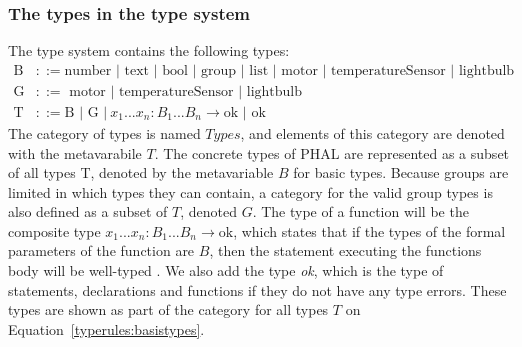 \subsubsection{The types in the type system}
The type system contains the following types:
\begin{equation}
\begin{split}
\text{B} &::= \text{number } | \text{ text } | \text{ bool } | \text{ group } | \text{ list } | \text{ motor } | \text{ temperatureSensor } | \text{ lightbulb}
\\
\text{G} &::= \text{ motor } | \text{ temperatureSensor } | \text{ lightbulb}
\\
\text{T} &::= \text{B } | \text{ G } |  \: x_1...x_n  : B_1...B_n \xrightarrow{} \text{ok } | \text{ ok}
\end{split}
\label{typerules:basistypes}
\end{equation}
The category of types is named $Types$, and elements of this category are denoted with the metavarabile $T$. The concrete types of PHAL are represented as a subset of all types T, denoted by the metavariable $B$ for basic types. Because groups are limited in which types they can contain, a category for the valid group types is also defined as a subset of $T$, denoted $G$.
The type of a function will be the composite type $x_1...x_n : B_1...B_n \xrightarrow{} \text{ok}$, which states that if the types of the formal parameters of the function are $B$, then the statement executing the functions body will be well-typed \cite{PilenVedTraeetsRod}. We also add the type \textit{ok}, which is the type of statements, declarations and functions if they do not have any type errors. These types are shown as part of the category for all types $T$ on Equation~\ref{typerules:basistypes}. 



